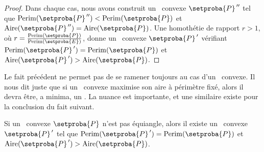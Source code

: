 \begin{proof}
	Dans chaque cas, nous avons construit un \ngone\ convexe $\dbleprimeit{\setproba{P}}$ tel que
	$\perim{\dbleprimeit{\setproba{P}}} < \perim{\setproba{P}}$
	et
	$\area{\dbleprimeit{\setproba{P}}} = \area{\setproba{P}}$.
	Une homothétie de rapport $r > 1$, où $r = \frac{ \perim{\setproba{P}} }{ \perim{\setproba{E}} }$, donne un \ngone\ convexe $\primeit{\setproba{P}}$ vérifiant
	$\perim{\primeit{\setproba{P}}} = \perim{\setproba{P}}$
	et
	$\area{\primeit{\setproba{P}}} > \area{\setproba{P}}$.
\end{proof}


\begin{remark}
	Le fait précédent ne permet pas de se ramener toujours au cas d'un \nequi\ convexe. Il nous dit juste que si un \ngone\ convexe maximise son aire à périmètre fixé, alors il devra être, a minima, un \nequi. La nuance est importante, et une similaire existe pour la conclusion du fait suivant.
\end{remark}




\begin{fact} \label{must-be-reg}
	Si un \nequi\ convexe $\setproba{P}$ n'est pas équiangle,
	alors il existe un \ngone\ convexe $\primeit{\setproba{P}}$ tel que
	$\perim{\primeit{\setproba{P}}} = \perim{\setproba{P}}$
	et
	$\area{\primeit{\setproba{P}}} > \area{\setproba{P}}$.
\end{fact}


